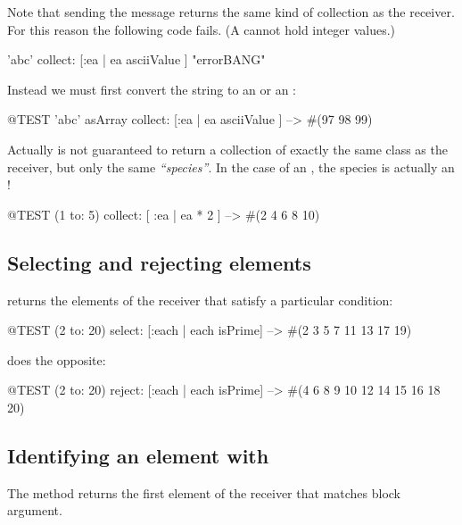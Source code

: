 \documentclass[a4paper,10pt,twoside]{book}
\begin{document}
Note that sending the message  returns the same kind of collection as the receiver.
For this reason the following code fails.
(A  cannot hold integer values.)
\begin{code}{}
'abc' collect: [:ea | ea asciiValue ]      "errorBANG"
\end{code}
\noindent
Instead we must first convert the string to an  or an :
\begin{code}{@TEST}
'abc' asArray collect: [:ea | ea asciiValue ] --> #(97 98 99)
\end{code}

Actually  is not guaranteed to return a collection of exactly the same class as the receiver, but only the same \emph{``species''}.  In the case of an , the species is actually an !
\begin{code}{@TEST}
(1 to: 5) collect: [ :ea | ea * 2 ] --> #(2 4 6 8 10)
\end{code}

\subsection{Selecting and rejecting elements}

 returns the elements of the receiver that satisfy a particular condition:

\begin{code}{@TEST}
(2 to: 20) select: [:each | each isPrime] --> #(2 3 5 7 11 13 17 19)
\end{code}

 does the opposite:
\begin{code}{@TEST}
(2 to: 20) reject: [:each | each isPrime] --> #(4 6 8 9 10 12 14 15 16 18 20)
\end{code}

\subsection{Identifying an element with }
The method  returns the first element of the receiver that matches block argument. 

\end{document}
